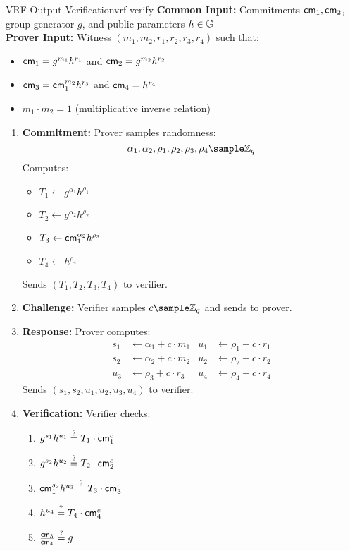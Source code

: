 \newpage
\begin{protocol}{VRF Output Verification}{vrf-verify}\label{pok-vrf}
\textbf{Common Input:} Commitments $\mathsf{cm}_1, \mathsf{cm}_2$, group generator $g$, and public parameters $h \in \mathbb{G}$\\
\textbf{Prover Input:} Witness $(m_1, m_2, r_1, r_2, r_3, r_4)$ such that:
\begin{itemize}
    \item $\mathsf{cm}_1 = g^{m_1}h^{r_1}$ and $\mathsf{cm}_2 = g^{m_2}h^{r_2}$
    \item $\mathsf{cm}_3 = \mathsf{cm}_1^{m_2}h^{r_3}$ and $\mathsf{cm}_4 = h^{r_4}$
    \item $m_1 \cdot m_2 = 1$ (multiplicative inverse relation)
\end{itemize}

\begin{enumerate}
    \item \textbf{Commitment:} Prover samples randomness:
    \[
        \alpha_1, \alpha_2, \rho_1, \rho_2, \rho_3, \rho_4 \sample \Z_q
    \]
    Computes:
    \begin{itemize}
        \item $T_1 \gets g^{\alpha_1}h^{\rho_1}$
        \item $T_2 \gets g^{\alpha_2}h^{\rho_2}$
        \item $T_3 \gets \mathsf{cm}_1^{\alpha_2}h^{\rho_3}$
        \item $T_4 \gets h^{\rho_4}$
    \end{itemize}
    Sends $(T_1, T_2, T_3, T_4)$ to verifier.
    
    \item \textbf{Challenge:} Verifier samples $c \sample \Z_q$ and sends to prover.
    
    \item \textbf{Response:} Prover computes:
    \begin{align*}
        s_1 &\gets \alpha_1 + c \cdot m_1 &u_1 &\gets \rho_1 + c \cdot r_1\\
        s_2 &\gets \alpha_2 + c \cdot m_2 &u_2 &\gets \rho_2 + c \cdot r_2\\
        u_3 &\gets \rho_3 + c \cdot r_3 &u_4 &\gets \rho_4 + c \cdot r_4
    \end{align*}
    Sends $(s_1, s_2, u_1, u_2, u_3, u_4)$ to verifier.
    
    \item \textbf{Verification:} Verifier checks:
    \begin{enumerate}[label=(\roman*)]
        \item $g^{s_1}h^{u_1} \stackrel{?}{=} T_1 \cdot \mathsf{cm}_1^c$
        \item $g^{s_2}h^{u_2} \stackrel{?}{=} T_2 \cdot \mathsf{cm}_2^c$
        \item $\mathsf{cm}_1^{s_2}h^{u_3} \stackrel{?}{=} T_3 \cdot \mathsf{cm}_3^c$
        \item $h^{u_4} \stackrel{?}{=} T_4 \cdot \mathsf{cm}_4^c$
        \item $\frac{\mathsf{cm}_3}{\mathsf{cm}_4} \stackrel{?}{=} g$
    \end{enumerate}
\end{enumerate}
\end{protocol}

